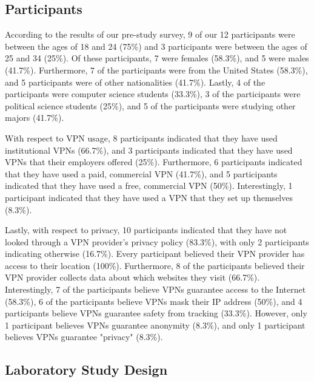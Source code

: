 \subsection{Participants} 
According to the results of our pre-study survey, 9 of our 12 participants were between the ages of 18 and 24 (75\%) and 3 participants were between the ages of 25 and 34 (25\%).
Of these participants, 7 were females (58.3\%), and 5 were males (41.7\%).
Furthermore, 7 of the participants were from the United States (58.3\%), and 5 participants were of other nationalities (41.7\%). 
Lastly, 4 of the participants were computer science students (33.3\%), 3 of the participants were political science students (25\%), and 5 of the participants were studying other majors (41.7\%).

With respect to VPN usage, 8 participants indicated that they have used institutional VPNs (66.7\%), and 3 participants indicated that they have used VPNs that their employers offered (25\%).
Furthermore, 6 participants indicated that they have used a paid, commercial VPN (41.7\%), and 5 participants indicated that they have used a free, commercial VPN (50\%).
Interestingly, 1 participant indicated that they have used a VPN that they set up themselves (8.3\%).

Lastly, with respect to privacy, 10 participants indicated that they have not looked through a VPN provider's privacy policy (83.3\%), with only 2 participants indicating otherwise (16.7\%).
Every participant believed their VPN provider has access to their location (100\%).
Furthermore, 8 of the participants believed their VPN provider collects data about which websites they visit (66.7\%).
Interestingly, 7 of the participants believe VPNs guarantee access to the Internet (58.3\%), 6 of the participants believe VPNs mask their IP address (50\%), and 4 participants believe VPNs guarantee safety from tracking (33.3\%).
However, only 1 participant believes VPNs guarantee anonymity (8.3\%), and only 1 participant believes VPNs guarantee "privacy" (8.3\%).
 
\subsection{Laboratory Study Design}

